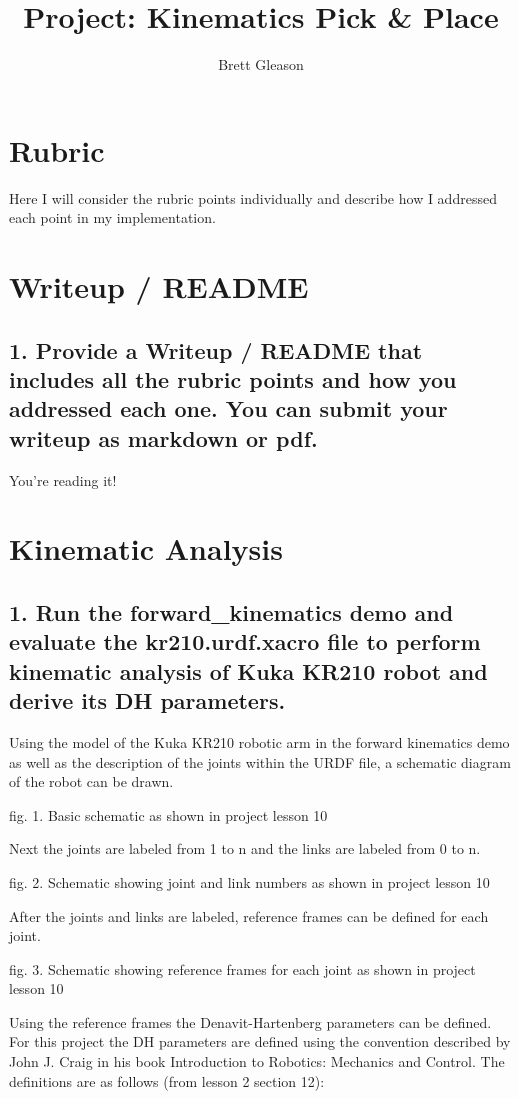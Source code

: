 \documentclass{article}
\begin{document}
\title{Project: Kinematics Pick \& Place}
\author{Brett Gleason}

\section{Rubric}
Here I will consider the rubric points individually and describe how I addressed each point in my implementation.  

\section{Writeup / README}

\subsection{1. Provide a Writeup / README that includes all the rubric points and how you addressed each one.  You can submit your writeup as markdown or pdf.}

You're reading it!

\section{Kinematic Analysis}
\subsection{1. Run the forward\_kinematics demo and evaluate the kr210.urdf.xacro file to perform kinematic analysis of Kuka KR210 robot and derive its DH parameters.}

Using the model of the Kuka KR210 robotic arm in the forward kinematics demo as well as the description of the joints within the URDF file, a schematic diagram of the robot can be drawn.

fig. 1. Basic schematic as shown in project lesson 10

Next the joints are labeled from 1 to n and the links are labeled from 0 to n.

fig. 2. Schematic showing joint and link numbers as shown in project lesson 10

After the joints and links are labeled, reference frames can be defined for each joint.

fig. 3. Schematic showing reference frames for each joint as shown in project lesson 10

Using the reference frames the Denavit-Hartenberg parameters can be defined. For this project the DH parameters are defined using the convention described by John J. Craig in his book Introduction to Robotics: Mechanics and Control. The definitions are as follows (from lesson 2 section 12):
\end{document}
